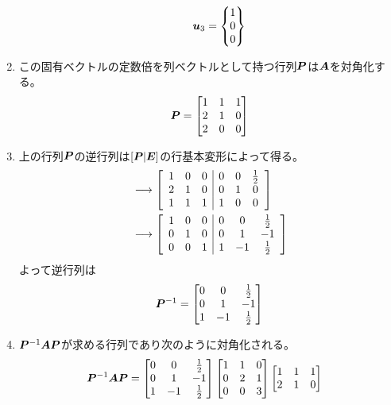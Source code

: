 \begin{ans*}
\begin{enumerate}[label=(\arabic*)]
\begin{enumerate}[label=(\roman*)]
\begin{gather}
        {\bm{u}}_{3} = \begin{Bmatrix}
          1 \\ 0 \\ 0
        \end{Bmatrix}
      \end{gather}
    \end{enumerate}
    \item この固有ベクトルの定数倍を列ベクトルとして持つ行列$\bm{P}$は$\bm{A}$を対角化する。
    \begin{gather}
      \bm{P} = \begin{bmatrix}
        1 & 1 & 1 \\
        2 & 1 & 0 \\
        2 & 0 & 0
      \end{bmatrix}
    \end{gather}
    \item 上の行列$\bm{P}$の逆行列は$[\bm{P}|\bm{E}]$の行基本変形によって得る。
    \begin{align}
      [\bP|\bE]
      &\lra \left[\begin{array}{ccc|ccc}
        1 & 0 & 0 & 0 & 0 & \frac{1}{2} \\
        2 & 1 & 0 & 0 & 1 & 0 \\
        1 & 1 & 1 & 1 & 0 & 0
      \end{array}\right] \\
      &\lra \left[\begin{array}{ccc|ccc}
        1 & 0 & 0 & 0 & 0 & \frac{1}{2} \\
        0 & 1 & 0 & 0 & 1 & -1 \\
        0 & 0 & 1 & 1 & -1 & \frac{1}{2}
      \end{array}\right]
    \end{align}
    よって逆行列は
    \begin{gather}
      \bm{P}^{-1} = \begin{bmatrix}
        0 & 0 & \frac{1}{2} \\
        0 & 1 & -1 \\
        1 & -1 & \frac{1}{2}
      \end{bmatrix}
    \end{gather}
    \item $\bm{P}^{-1}\bm{A}\bm{P}$が求める行列であり次のように対角化される。
    \begin{align}
      \bm{P}^{-1}\bm{A}\bm{P}
      &= \begin{bmatrix}
        0 & 0 & \frac{1}{2} \\
        0 & 1 & -1 \\
        1 & -1 & \frac{1}{2}
      \end{bmatrix}\begin{bmatrix}
        1 & 1 & 0 \\
        0 & 2 & 1 \\
        0 & 0 & 3
      \end{bmatrix}\begin{bmatrix}
        1 & 1 & 1 \\
        2 & 1 & 0 \\
\end{bmatrix}
\end{align}
\end{enumerate}
\end{ans*}
